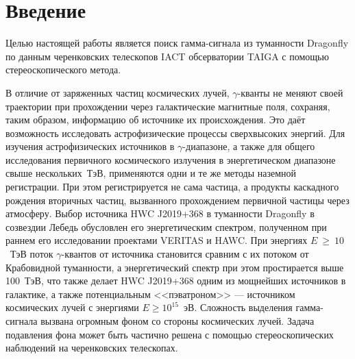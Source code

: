 \documentclass[magd,floatypics,numeref]{msudipl} %
\begin{document}
\author{Разумов Александр Юрьевич}
\maketitle


\tableofcontents   %

\chapter*{Введение}   %
Целью настоящей работы является поиск гамма-сигнала из туманности Dragonfly по данным черенковских телескопов IACT обсерватории TAIGA с помощью стереоскопического метода. 

В отличие от заряженных частиц космических лучей, $\gamma$-кванты не меняют своей траектории при прохождении через галактические магнитные поля, сохраняя, таким образом, информацию об источнике их происхождения. Это даёт возможность исследовать астрофизические процессы сверхвысоких энергий. Для изучения астрофизических источников в $\gamma$-диапазоне, а также для общего исследования первичного космического излучения в энергетическом диапазоне свыше нескольких~ТэВ, применяются одни и те же методы наземной регистрации. При этом регистрируется не сама частица, а продукты каскадного рождения вторичных частиц, вызванного прохождением первичной частицы через атмосферу. Выбор источника HWC J2019+368 в туманности Dragonfly в созвездии Лебедь обусловлен его энергетическим спектром, полученном при раннем его исследовании проектами VERITAS и HAWC. При энергиях $E~\geq~10$~ТэВ поток $\gamma$-квантов от источника становится сравним с их потоком от Крабовидной туманности, а энергетический спектр при этом простирается выше 100~ТэВ, что также делает HWC J2019+368 одним из мощнейших источников в галактике, а также потенциальным  <<пэватроном>> --- источником космических лучей с энергиями $E\geq10^{15}$~эВ. Сложность выделения гамма-сигнала вызвана огромным фоном со стороны космических лучей. Задача подавления фона может быть частично решена с помощью стереоскопических наблюдений на черенковских телескопах.
\end{document}
